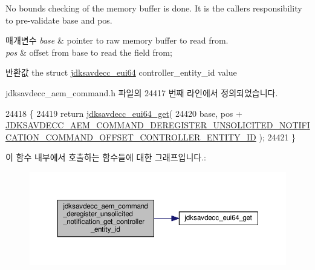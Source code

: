 No bounds checking of the memory buffer is done. It is the caller\textquotesingle{}s responsibility to pre-\/validate base and pos.


\begin{DoxyParams}{매개변수}
{\em base} & pointer to raw memory buffer to read from. \\
\hline
{\em pos} & offset from base to read the field from; \\
\hline
\end{DoxyParams}
\begin{DoxyReturn}{반환값}
the struct \hyperlink{structjdksavdecc__eui64}{jdksavdecc\+\_\+eui64} controller\+\_\+entity\+\_\+id value 
\end{DoxyReturn}


jdksavdecc\+\_\+aem\+\_\+command.\+h 파일의 24417 번째 라인에서 정의되었습니다.


\begin{DoxyCode}
24418 \{
24419     \textcolor{keywordflow}{return} \hyperlink{group__eui64_ga2652311a25a6b91cddbed75c108c7031}{jdksavdecc\_eui64\_get}(
24420         base, pos + 
      \hyperlink{group__command__deregister__unsolicited__notification_gad103bdcb2ffba018c56ac6068e9839d1}{JDKSAVDECC\_AEM\_COMMAND\_DEREGISTER\_UNSOLICITED\_NOTIFICATION\_COMMAND\_OFFSET\_CONTROLLER\_ENTITY\_ID}
       );
24421 \}
\end{DoxyCode}


이 함수 내부에서 호출하는 함수들에 대한 그래프입니다.\+:
\nopagebreak
\begin{figure}[H]
\begin{center}
\leavevmode
\includegraphics[width=350pt]{group__command__deregister__unsolicited__notification_ga02e36d5e00d09169feabfedf5edb7419_cgraph}
\end{center}
\end{figure}


